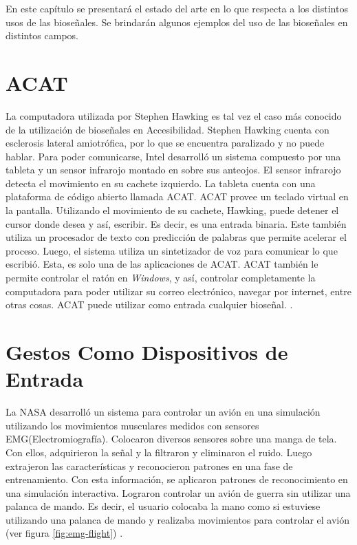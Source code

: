En este capítulo se presentará el estado del arte en lo que respecta a los distintos usos de las bioseñales. Se brindarán algunos ejemplos del uso de las bioseñales en distintos campos.

\section{ACAT}

La computadora utilizada por Stephen Hawking es tal vez el caso más conocido de la utilización de bioseñales en Accesibilidad. Stephen Hawking cuenta con esclerosis lateral amiotrófica, por lo que se encuentra paralizado y no puede hablar. Para poder comunicarse, Intel desarrolló un sistema compuesto por una tableta y un sensor infrarojo montado en sobre sus anteojos. El sensor infrarojo detecta el movimiento en su cachete izquierdo. La tableta cuenta con una plataforma de código abierto llamada ACAT. ACAT provee un teclado virtual en la pantalla. Utilizando el movimiento de su cachete, Hawking, puede detener el cursor donde desea y así, escribir. Es decir, es una entrada binaria. Este también utiliza un procesador de texto con predicción de palabras que permite acelerar el proceso.  Luego, el sistema utiliza un sintetizador de voz para comunicar lo que escribió. Esta, es solo una de las aplicaciones de ACAT. ACAT también le permite controlar el ratón en \emph{Windows}, y así, controlar completamente la computadora para poder utilizar su correo electrónico, navegar por internet, entre otras cosas. ACAT puede utilizar como entrada cualquier bioseñal. \cite{hawking}.

\section{Gestos Como Dispositivos de Entrada}

La NASA desarrolló un sistema para controlar un avión en una simulación utilizando los movimientos musculares medidos con sensores EMG(Electromiografía). Colocaron diversos sensores sobre una manga de tela. Con ellos, adquirieron la señal y la filtraron y eliminaron el ruido. Luego extrajeron las características y reconocieron patrones en una fase de entrenamiento. Con esta información, se aplicaron patrones de reconocimiento en una simulación interactiva. Lograron controlar un avión de guerra sin utilizar una palanca de mando. Es decir, el usuario colocaba la mano como si estuviese utilizando una palanca de mando y realizaba movimientos para controlar el avión (ver figura \ref{fig:emg-flight}) \cite{emg-flight}.


